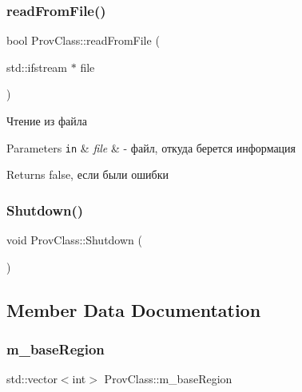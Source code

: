 \subsubsection{\texorpdfstring{read\+From\+File()}{readFromFile()}}
{\footnotesize\ttfamily bool Prov\+Class\+::read\+From\+File (\begin{DoxyParamCaption}\item[{std\+::ifstream $\ast$}]{file }\end{DoxyParamCaption})\hspace{0.3cm}{\ttfamily [private]}}



Чтение из файла 


\begin{DoxyParams}[1]{Parameters}
\mbox{\tt in}  & {\em file} & -\/ файл, откуда берется информация \\
\hline
\end{DoxyParams}
\begin{DoxyReturn}{Returns}
false, если были ошибки 
\end{DoxyReturn}
\mbox{\label{class_prov_class_aab053eb395e45580e5c65fd74e264361}} 
\subsubsection{\texorpdfstring{Shutdown()}{Shutdown()}}
{\footnotesize\ttfamily void Prov\+Class\+::\+Shutdown (\begin{DoxyParamCaption}{ }\end{DoxyParamCaption})}



\subsection{Member Data Documentation}
\mbox{\label{class_prov_class_aa24dfaa725d9920c7602b04c4084a798}} 
\subsubsection{\texorpdfstring{m\+\_\+base\+Region}{m\_baseRegion}}
{\footnotesize\ttfamily std\+::vector$<$int$>$ Prov\+Class\+::m\+\_\+base\+Region\hspace{0.3cm}{\ttfamily [private]}}



